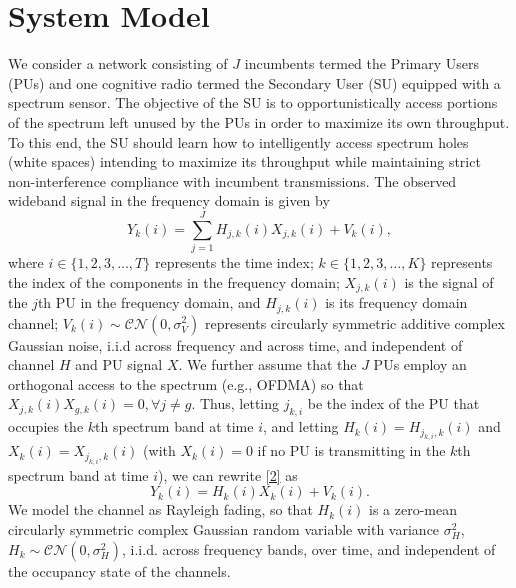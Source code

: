 \documentclass[10pt,twocolumn]{IEEEtran}
\begin{document}
\section{System Model}\label{II}
We consider a network consisting of $J$ incumbents termed the Primary Users (PUs) and one cognitive radio termed the Secondary User (SU) equipped with a spectrum sensor. The objective of the SU is to opportunistically access portions of the spectrum left unused by the PUs in order to maximize its own throughput. To this end, the SU should learn how to intelligently access spectrum holes (white spaces) intending to maximize its throughput while maintaining strict non-interference compliance with incumbent transmissions. The observed wideband signal in the frequency domain is given by
\vspace{-4mm}
\begin{equation}\label{2}
    Y_k(i) = \sum_{j=1}^{J} H_{j,k}(i)X_{j,k}(i) + V_k(i),
\end{equation}
where $i {\in} \{1,2,3,\dots,T\}$ represents the time index; $k {\in} \{1,2,3,\dots,K\}$ represents the index of the components in the frequency domain; $X_{j,k}(i)$ is the signal of the $j$th PU in the frequency domain, and $H_{j,k}(i)$ is its frequency domain channel; $V_k(i) {\sim} \mathcal{CN}(0,\sigma_V^2)$ represents circularly symmetric additive complex Gaussian noise, i.i.d across frequency and across time, and independent of channel $H$ and PU signal $X$. We further assume that the $J$ PUs employ an orthogonal access to the spectrum (e.g., OFDMA) so that $X_{j,k}(i)X_{g,k}(i){=}0, \forall j{\neq}g$. Thus, letting $j_{k,i}$ be the index of the PU that occupies the $k$th spectrum band at time $i$, and letting  $H_{k}(i){=}H_{j_{k,i},k}(i)$ and $X_{k}(i){=}X_{j_{k,i},k}(i)$ (with $X_{k}(i){=}0$ if no PU is transmitting in the $k$th spectrum band at time $i$), we can rewrite \eqref{2} as 
\begin{equation}\label{3}
    Y_k(i) = H_{k}(i)X_{k}(i) + V_k(i).
\end{equation}
We model the channel as Rayleigh fading, so that $H_{k}(i)$ is a zero-mean circularly symmetric complex Gaussian random variable with variance $\sigma_H^2$, $H_k {\sim} \mathcal{CN}(0,\sigma_H^2)$, i.i.d. across frequency bands, over time, and independent of the occupancy state of the channels.
\end{document}

